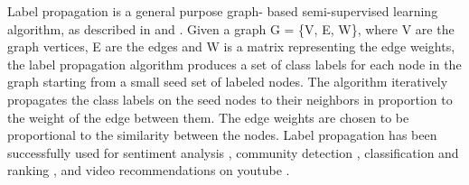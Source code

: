 Label propagation is a general purpose graph- based semi-supervised learning
algorithm, as described in \cite{zhu2002learning} and \cite{talukdar:09}.
Given a graph G = \{V, E, W\}, where V are the graph vertices, E are the edges
and W is a matrix representing the edge weights, the label propagation
algorithm produces a set of class labels for each node in the graph starting
from a small seed set of labeled nodes. The algorithm iteratively propagates
the class labels on the seed nodes to their neighbors in proportion to the
weight of the edge between them. The edge weights are chosen to be
proportional to the similarity between the nodes. Label propagation has been
successfully used for sentiment analysis \cite{speriosu2011twitter}, community
detection \cite{raghavan2007near}, classification and ranking
\cite{talukdar:10}, and video recommendations on youtube
\cite{baluja2008video}.
